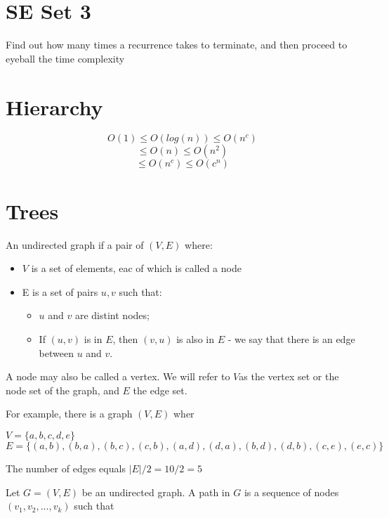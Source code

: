 \documentclass[10pt,a4paper]{article}
\begin{document}
\begin{multicols}{3}
\begin{itemize}
    \end{itemize}


    \section{SE Set 3}
    Find out how many times a recurrence takes to terminate, and then proceed to eyeball the time complexity

    \section{Hierarchy}
    $$O(1) \leqslant O(log(n)) \leqslant O(n^c)$$ 
    $$\leqslant O(n) \leqslant O(n^2)$$ 
    $$\leqslant O(n^c) \leqslant O(c^n)$$

    \section{Trees}

    An undirected graph if a pair of $(V, E)$ where:

    \begin{itemize}
        \item $V$ is a set of elements, eac of which is called a node
        \item E is a set of pairs $u, v$ such that:
        \begin{itemize}
            \item $u$ and $v$ are distint nodes;
            \item If $(u, v)$ is in $E$, then $(v, u)$ is also in $E$ - we say that there is an edge between $u$ and $v$.
        \end{itemize} 
    \end{itemize}

    A node may also be called a vertex. We will refer to $V$as the vertex set or the node set of the graph, and $E$ the edge set.

    For example, there is a graph $(V, E)$ wher 

    $V = \{ a, b, c, d, e\}$
    $E = \{ (a, b),(b, a),(b, c),(c, b),(a, d),(d, a),(b, d), (d, b), (c, e),(e, c) \}$

    The number of edges equals $|E| / 2 = 10 / 2 = 5$

    Let $G = (V, E)$ be an undirected graph. A path in $G$ is a sequence of nodes $(v_1, v_2, ..., v_k)$ such that


\end{multicols}
\end{document}

